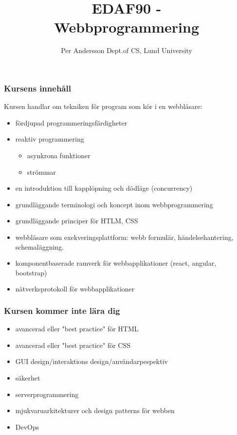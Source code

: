 \documentclass[aspectratio=1610]{beamer}
\title[EDAF90 Webbprogrammering]{EDAF90 - \\Webbprogrammering}
\author[Per Andersson]{%
  Per Andersson\newline
  Dept.\@ of CS, Lund University}
\begin{document}
\begin{frame}[plain]%
  \titlepage
\end{frame}

\begin{frame}
  \frametitle{Kursens innehåll}

Kursen handlar om tekniken för program som kör i en webbläsare:
\begin{itemize}
\item fördjupad programmeringsfärdigheter
\item reaktiv programmering
\begin{itemize}
  \item asynkrona funktioner
  \item strömmar
\end{itemize}
\item en introduktion till kapplöpning och dödläge (concurrency)
\item grundläggande terminologi och koncept inom webbprogrammering
\item grundläggande principer för HTLM, CSS
\item webbläsare som exekveringsplattform: webb formulär, händelsehantering, schemaläggning.
\item komponentbaserade ramverk för webbapplikationer (react, angular, bootstrap)
\item nätverksprotokoll för webbapplikationer
\end{itemize}

\end{frame}


\begin{frame}
  \frametitle{Kursen kommer inte lära dig}
\begin{itemize}
\item avancerad eller "best practice" för HTML
\item avancerad eller "best practice" för CSS
\item GUI design/interaktions design/användarpespektiv
\item säkerhet
\item serverprogrammering
\item mjukvaruarkitekturer och design patterns för webben
\item DevOps
\end{itemize}

\end{frame}
\end{document}
